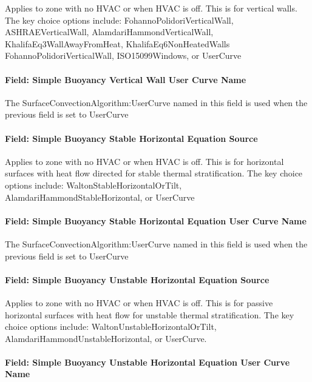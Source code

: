 Applies to zone with no HVAC or when HVAC is off. This is for vertical walls. The key choice options include: FohannoPolidoriVerticalWall, ASHRAEVerticalWall, AlamdariHammondVerticalWall, KhalifaEq3WallAwayFromHeat, KhalifaEq6NonHeatedWalls FohannoPolidoriVerticalWall, ISO15099Windows, or UserCurve

\paragraph{Field: Simple Buoyancy Vertical Wall User Curve Name}\label{field-simple-buoyancy-vertical-wall-user-curve-name}

The SurfaceConvectionAlgorithm:UserCurve named in this field is used when the previous field is set to UserCurve

\paragraph{Field: Simple Buoyancy Stable Horizontal Equation Source}\label{field-simple-buoyancy-stable-horizontal-equation-source}

Applies to zone with no HVAC or when HVAC is off. This is for horizontal surfaces with heat flow directed for stable thermal stratification. The key choice options include: WaltonStableHorizontalOrTilt, AlamdariHammondStableHorizontal, or UserCurve

\paragraph{Field: Simple Buoyancy Stable Horizontal Equation User Curve Name}\label{field-simple-buoyancy-stable-horizontal-equation-user-curve-name}

The SurfaceConvectionAlgorithm:UserCurve named in this field is used when the previous field is set to UserCurve

\paragraph{Field: Simple Buoyancy Unstable Horizontal Equation Source}\label{field-simple-buoyancy-unstable-horizontal-equation-source}

Applies to zone with no HVAC or when HVAC is off. This is for passive horizontal surfaces with heat flow for unstable thermal stratification. The key choice options include: WaltonUnstableHorizontalOrTilt, AlamdariHammondUnstableHorizontal, or UserCurve.

\paragraph{Field: Simple Buoyancy Unstable Horizontal Equation User Curve Name}\label{field-simple-buoyancy-unstable-horizontal-equation-user-curve-name}

